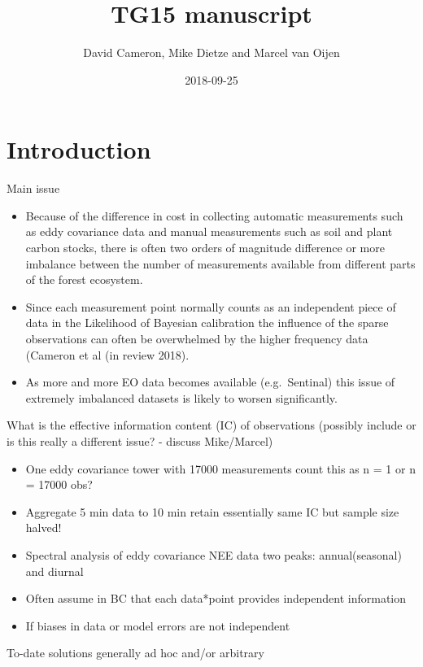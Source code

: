\documentclass[]{article}
\title{TG15 manuscript}
\author{David Cameron, Mike Dietze and Marcel van Oijen}
\date{2018-09-25}
\providecommand{\tightlist}{%
  \setlength{\itemsep}{0pt}\setlength{\parskip}{0pt}}
\begin{document}
\maketitle

{
\setcounter{tocdepth}{2}
\tableofcontents
}
\section{Introduction}\label{introduction}

Main issue

\begin{itemize}
\tightlist
\item
  Because of the difference in cost in collecting automatic measurements
  such as eddy covariance data and manual measurements such as soil and
  plant carbon stocks, there is often two orders of magnitude difference
  or more imbalance between the number of measurements available from
  different parts of the forest ecosystem.
\item
  Since each measurement point normally counts as an independent piece
  of data in the Likelihood of Bayesian calibration the influence of the
  sparse observations can often be overwhelmed by the higher frequency
  data (Cameron et al (in review 2018).
\item
  As more and more EO data becomes available (e.g.~Sentinal) this issue
  of extremely imbalanced datasets is likely to worsen significantly.
\end{itemize}

What is the effective information content (IC) of observations (possibly
include or is this really a different issue? - discuss Mike/Marcel)

\begin{itemize}
\tightlist
\item
  One eddy covariance tower with 17000 measurements count this as n = 1
  or n = 17000 obs?
\item
  Aggregate 5 min data to 10 min retain essentially same IC but sample
  size halved!
\item
  Spectral analysis of eddy covariance NEE data two peaks:
  annual(seasonal) and diurnal
\item
  Often assume in BC that each data*point provides independent
  information
\item
  If biases in data or model errors are not independent
\end{itemize}

To-date solutions generally ad hoc and/or arbitrary
\end{document}
